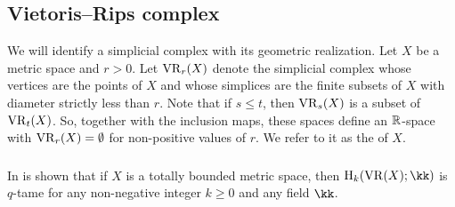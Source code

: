 %
%
%

\subsection{Vietoris--Rips complex}\label{ss:vietoris-rips}

We will identify a simplicial complex with its geometric realization.
Let $X$ be a metric space and $r > 0$.
Let $\operatorname{VR}_r(X)$ denote the simplicial complex whose vertices are the points of $X$ and whose simplices are the finite subsets of $X$ with diameter strictly less than $r$.
Note that if $s \leq t$, then $\operatorname{VR}_s(X)$ is a subset of $\operatorname{VR}_t(X)$.
So, together with the inclusion maps, these spaces define an $\mathbb{R}$-space with $\operatorname{VR}_r(X) = \emptyset$ for non-positive values of $r$.
We refer to it as the  of $X$.

\subsubsection{} In \cite[Prop.~5.1]{chazal2014geometric} is shown that if $X$ is a totally bounded metric space, then $\rH_k(\VR(X); \kk)$ is $q$-tame for any non-negative integer $k \geq 0$ and any field $\kk$.

